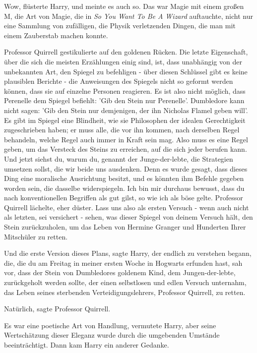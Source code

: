 \glqq{}Wow\grqq{}, flüsterte Harry, und meinte es auch so. Das war Magie mit
einem großen M, die Art von Magie, die in \emph{So You Want To Be A Wizard
}auftauchte, nicht nur eine Sammlung von zufälligen, die Physik verletzenden
Dingen, die man mit einem Zauberstab machen konnte.

Professor Quirrell gestikulierte auf den goldenen Rücken. \glqq{}Die letzte
Eigenschaft, über die sich die meisten Erzählungen einig sind, ist, dass
unabhängig von der unbekannten Art, den Spiegel zu befehligen - über diesen
Schlüssel gibt es keine plausiblen Berichte - die Anweisungen des Spiegels nicht
so geformt werden können, dass sie auf einzelne Personen reagieren. Es ist also
nicht möglich, dass Perenelle dem Spiegel befiehlt: 'Gib den Stein nur
Perenelle'. Dumbledore kann nicht sagen: 'Gib den Stein nur demjenigen, der ihn
Nicholas Flamel geben will'. Es gibt im Spiegel eine Blindheit, wie sie
Philosophen der idealen Gerechtigkeit zugeschrieben haben; er muss alle, die vor
ihn kommen, nach derselben Regel behandeln, welche Regel auch immer in Kraft
sein mag. Also muss es eine Regel geben, um das Versteck des Steins zu
erreichen, auf die sich jeder berufen kann. Und jetzt siehst du, warum du,
genannt der Junge-der-lebte, die Strategien umsetzen sollst, die wir beide uns
ausdenken. Denn es wurde gesagt, dass dieses Ding eine moralische Ausrichtung
besitzt, und es könnten ihm Befehle gegeben worden sein, die dasselbe
widerspiegeln. Ich bin mir durchaus bewusst, dass du nach konventionellen
Begriffen als gut gilst, so wie ich als böse gelte.\grqq{} Professor Quirrell
lächelte, eher düster. \glqq{}Lass uns also als ersten Versuch - wenn auch nicht
als letzten, sei versichert - sehen, was dieser Spiegel von deinem Versuch hält,
den Stein zurückzuholen, um das Leben von Hermine Granger und Hunderten Ihrer
Mitschüler zu retten.\grqq{}

\glqq{}Und die erste Version dieses Plans\grqq{}, sagte Harry, der endlich zu
verstehen begann, \glqq{}die, die du am Freitag in meiner ersten Woche in
Hogwarts erfunden hast, sah vor, dass der Stein von Dumbledores goldenem Kind,
dem Jungen-der-lebte, zurückgeholt werden sollte, der einen selbstlosen und
edlen Versuch unternahm, das Leben seines sterbenden Verteidigungslehrers,
Professor Quirrell, zu retten.\grqq{}

\glqq{}Natürlich\grqq{}, sagte Professor Quirrell.

Es war eine poetische Art von Handlung, vermutete Harry, aber seine
Wertschätzung dieser Eleganz wurde durch die umgebenden Umstände beeinträchtigt.
Dann kam Harry ein anderer Gedanke.

